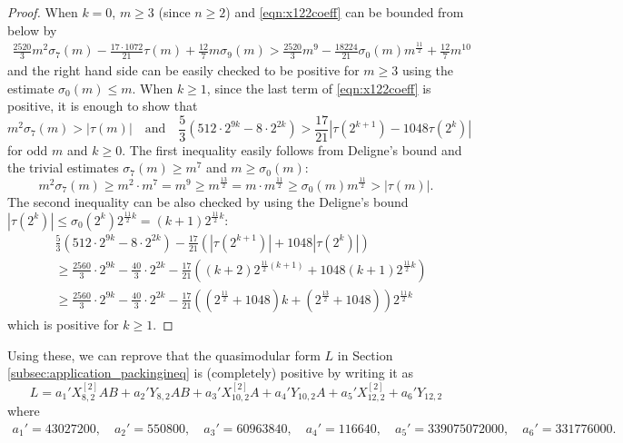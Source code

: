 \documentclass[10pt,reqno]{amsproc}
\newcommand{\1}{\mathds{1}}	%
\theoremstyle{definition}
\theoremstyle{remark}
\begin{document}
\begin{proof}
When $k = 0$, $m \ge 3$ (since $n \ge 2$) and \eqref{eqn:x122coeff} can be bounded from below by
\begin{align}
\frac{2520}{3} m^2 \sigma_7(m) - \frac{17 \cdot 1072}{21} \tau(m) + \frac{12}{7} m\sigma_9(m) > \frac{2520}{3} m^9 - \frac{18224}{21} \sigma_0(m)m^{\frac{11}{2}} + \frac{12}{7} m^{10} \label{eqn:appendix_ineq1}
\end{align}
and the right hand side can be easily checked to be positive for $m \ge 3$ using the estimate $\sigma_0(m) \le m$.
When $k \ge 1$, since the last term of \eqref{eqn:x122coeff} is positive, it is enough to show that
\[
m^2 \sigma_7(m) > |\tau(m)|\quad \text{and}\quad \frac{5}{3} (512 \cdot 2^{9k} - 8 \cdot 2^{2k}) > \frac{17}{21} |\tau(2^{k+1}) - 1048 \tau(2^k)| 
\]
for odd $m$ and $k \ge 0$.
The first inequality easily follows from Deligne's bound and the trivial estimates $\sigma_7(m) \ge m^7$ and $m \ge \sigma_0(m)$:
\[
m^2 \sigma_7(m) \ge m^2 \cdot m^7 = m^9 \ge m^{\frac{13}{2}} = m \cdot m^{\frac{11}{2}} \ge \sigma_0(m) m^{\frac{11}{2}} > |\tau(m)|.
\]
The second inequality can be also checked by using the Deligne's bound $|\tau(2^k)| \le \sigma_0(2^k) 2^{\frac{11}{2}k} = (k+1) 2^{\frac{11}{2}k}$:
\begin{align}
    &\frac{5}{3} (512 \cdot 2^{9k} - 8 \cdot 2^{2k}) - \frac{17}{21} (|\tau(2^{k+1})| + 1048 |\tau(2^{k})|) \nonumber \\
    &\ge \frac{2560}{3} \cdot 2^{9k} - \frac{40}{3} \cdot 2^{2k} - \frac{17}{21} ((k+2) 2^{\frac{11}{2}(k+1)} + 1048 (k+1) 2^{\frac{11}{2}k}) \nonumber \\
    &\ge \frac{2560}{3} \cdot 2^{9k} - \frac{40}{3} \cdot 2^{2k} - \frac{17}{21} ((2^{\frac{11}{2}} + 1048)k + (2^{\frac{13}{2}} + 1048)) 2^{\frac{11}{2}k} \label{eqn:appendix_ineq2}
\end{align}
which is positive for $k \ge 1$.
\end{proof}
Using these, we can reprove that the quasimodular form $L$ in Section \ref{subsec:application_packingineq} is (completely) positive by writing it as
\[
L = a_1' X_{8, 2}^{[2]} AB + a_2' Y_{8, 2} AB + a_3' X_{10, 2}^{[2]} A + a_4' Y_{10, 2} A + a_5' X_{12, 2}^{[2]} + a_6' Y_{12, 2}
\]
where
\begin{align*}
    a_1' = 43027200, \quad
    a_2' = 550800, \quad
    a_3' = 60963840, \quad
    a_4' = 116640, \quad
    a_5' = 339075072000, \quad
    a_6' = 331776000.
\end{align*}
\end{document}
